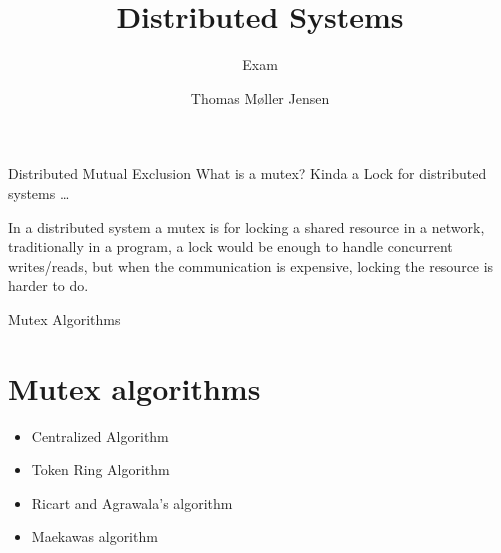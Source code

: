 \documentclass[aspectratio=1610,17pt,utf8]{beamer}
\title[DS]{Distributed Systems}
\subtitle{Exam}
\author[Thomas Møller Jensen]{Thomas Møller Jensen}
\institute[Institute of Computer Science]
{
  Aalborg University\\
}
\begin{document}

\begin{frame}{Distributed Mutual Exclusion}
    What is a mutex? Kinda a Lock for distributed systems \ldots

    In a distributed system a mutex is for locking a shared resource in a network, traditionally in a program, a lock would be enough to handle concurrent writes/reads, but when the communication is expensive, locking the resource is harder to do.
\end{frame}

\begin{frame}{Mutex Algorithms}
    \section{Mutex algorithms}
    \begin{itemize}
        \item Centralized Algorithm
        \item Token Ring Algorithm
        \item Ricart and Agrawala's algorithm
        \item Maekawas algorithm
    \end{itemize}
\end{frame}
\end{document}

